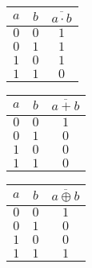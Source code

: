 \begin{Row}
	\begin{Cell}{1}
		\centering
		\begin{tabular}{cc|c}
			\toprule
			$a$ & $b$ & $\overline{a\cdot b}$ \\
			\midrule
			$0$ & $0$ & $1$                   \\
			$0$ & $1$ & $1$                   \\
			$1$ & $0$ & $1$                   \\
			$1$ & $1$ & $0$                   \\
			\bottomrule
		\end{tabular}
		\vspace{1ex}
	\end{Cell}
	\begin{Cell}{1}
		\centering
		\begin{tabular}{cc|c}
			\toprule
			$a$ & $b$ & $\overline{a+b}$ \\
			\midrule
			$0$ & $0$ & $1$              \\
			$0$ & $1$ & $0$              \\
			$1$ & $0$ & $0$              \\
			$1$ & $1$ & $0$              \\
			\bottomrule
		\end{tabular}
		\vspace{1ex}
	\end{Cell}
	\begin{Cell}{1}
		\centering
		\begin{tabular}{cc|c}
			\toprule
			$a$ & $b$ & $\overline{a \oplus b}$ \\
			\midrule
			$0$ & $0$ & $1$                     \\
			$0$ & $1$ & $0$                     \\
			$1$ & $0$ & $0$                     \\
			$1$ & $1$ & $1$                     \\
			\bottomrule
		\end{tabular}
		\vspace{1ex}
	\end{Cell}
\end{Row}

